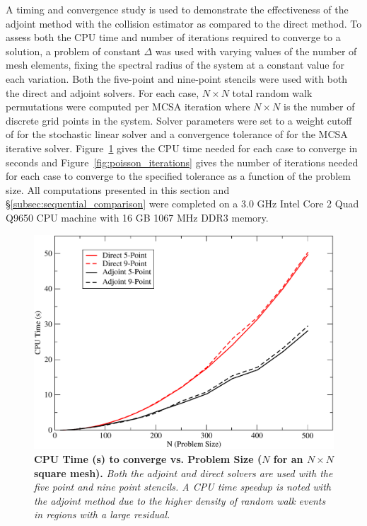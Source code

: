 A timing and convergence study is used to demonstrate the
effectiveness of the adjoint method with the collision estimator as
compared to the direct method. To assess both the CPU time and number
of iterations required to converge to a solution, a problem of
constant $\Delta$ was used with varying values of the number of mesh
elements, fixing the spectral radius of the system at a constant value
for each variation. Both the five-point and nine-point stencils were
used with both the direct and adjoint solvers. For each case, $N
\times N$ total random walk permutations were computed per MCSA
iteration where $N \times N$ is the number of discrete grid points in
the system. Solver parameters were set to a weight cutoff of
 for the stochastic linear solver and a convergence
tolerance of  for the MCSA iterative solver.
Figure~\ref{fig:poisson_cpu_time} gives the CPU time needed for each
case to converge in seconds and Figure~\ref{fig:poisson_iterations}
gives the number of iterations needed for each case to converge to the
specified tolerance as a function of the problem size. All
computations presented in this section and
\S\ref{subsec:sequential_comparison} were completed on a 3.0 GHz Intel
Core 2 Quad Q9650 CPU machine with 16 GB 1067 MHz DDR3 memory.
\begin{figure}[t!]
  \centering
  \includegraphics[width=5in,clip]{chapters/mc_background/dir_adj_cpu.pdf}
  \caption{\textbf{CPU Time (s) to converge vs. Problem Size ($N$ for
      an $N \times N$ square mesh).} \textit{Both the adjoint and
      direct solvers are used with the five point and nine point
      stencils. A CPU time speedup is noted with the adjoint method
      due to the higher density of random walk events in regions with
      a large residual.}}
  \label{fig:poisson_cpu_time}
\end{figure}

